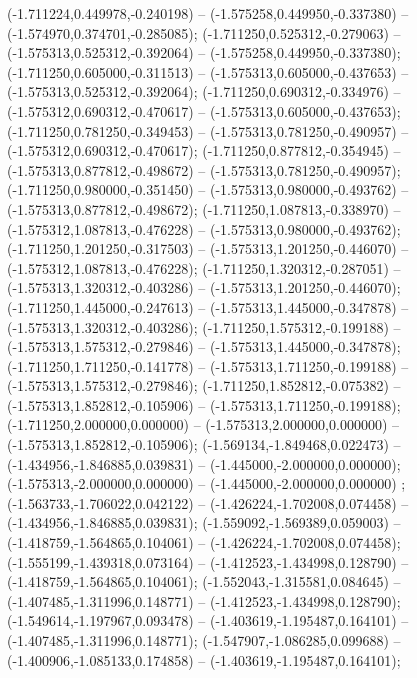  (-1.711224,0.449978,-0.240198) -- (-1.575258,0.449950,-0.337380) -- (-1.574970,0.374701,-0.285085);
 (-1.711250,0.525312,-0.279063) -- (-1.575313,0.525312,-0.392064) -- (-1.575258,0.449950,-0.337380);
 (-1.711250,0.605000,-0.311513) -- (-1.575313,0.605000,-0.437653) -- (-1.575313,0.525312,-0.392064);
 (-1.711250,0.690312,-0.334976) -- (-1.575312,0.690312,-0.470617) -- (-1.575313,0.605000,-0.437653);
 (-1.711250,0.781250,-0.349453) -- (-1.575313,0.781250,-0.490957) -- (-1.575312,0.690312,-0.470617);
 (-1.711250,0.877812,-0.354945) -- (-1.575313,0.877812,-0.498672) -- (-1.575313,0.781250,-0.490957);
 (-1.711250,0.980000,-0.351450) -- (-1.575313,0.980000,-0.493762) -- (-1.575313,0.877812,-0.498672);
 (-1.711250,1.087813,-0.338970) -- (-1.575312,1.087813,-0.476228) -- (-1.575313,0.980000,-0.493762);
 (-1.711250,1.201250,-0.317503) -- (-1.575313,1.201250,-0.446070) -- (-1.575312,1.087813,-0.476228);
 (-1.711250,1.320312,-0.287051) -- (-1.575313,1.320312,-0.403286) -- (-1.575313,1.201250,-0.446070);
 (-1.711250,1.445000,-0.247613) -- (-1.575313,1.445000,-0.347878) -- (-1.575313,1.320312,-0.403286);
 (-1.711250,1.575312,-0.199188) -- (-1.575313,1.575312,-0.279846) -- (-1.575313,1.445000,-0.347878);
 (-1.711250,1.711250,-0.141778) -- (-1.575313,1.711250,-0.199188) -- (-1.575313,1.575312,-0.279846);
 (-1.711250,1.852812,-0.075382) -- (-1.575313,1.852812,-0.105906) -- (-1.575313,1.711250,-0.199188);
 (-1.711250,2.000000,0.000000) -- (-1.575313,2.000000,0.000000) -- (-1.575313,1.852812,-0.105906);
 (-1.569134,-1.849468,0.022473) -- (-1.434956,-1.846885,0.039831) -- (-1.445000,-2.000000,0.000000);
 (-1.575313,-2.000000,0.000000) -- (-1.445000,-2.000000,0.000000) ;
 (-1.563733,-1.706022,0.042122) -- (-1.426224,-1.702008,0.074458) -- (-1.434956,-1.846885,0.039831);
 (-1.559092,-1.569389,0.059003) -- (-1.418759,-1.564865,0.104061) -- (-1.426224,-1.702008,0.074458);
 (-1.555199,-1.439318,0.073164) -- (-1.412523,-1.434998,0.128790) -- (-1.418759,-1.564865,0.104061);
 (-1.552043,-1.315581,0.084645) -- (-1.407485,-1.311996,0.148771) -- (-1.412523,-1.434998,0.128790);
 (-1.549614,-1.197967,0.093478) -- (-1.403619,-1.195487,0.164101) -- (-1.407485,-1.311996,0.148771);
 (-1.547907,-1.086285,0.099688) -- (-1.400906,-1.085133,0.174858) -- (-1.403619,-1.195487,0.164101);
